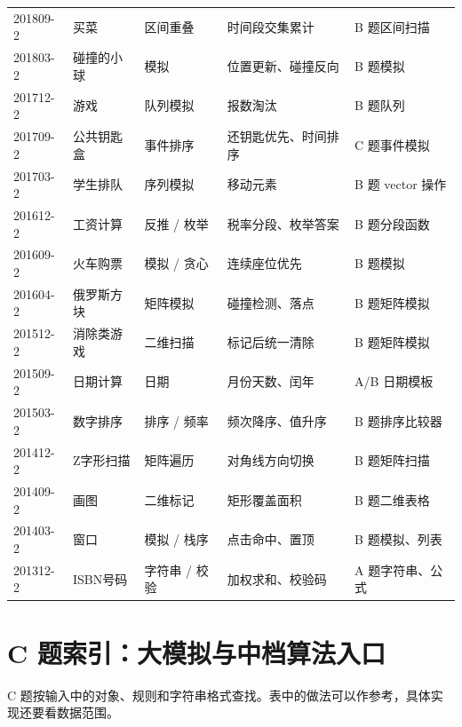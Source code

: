 \begin{longtable}{p{1.8cm}p{2.8cm}p{2.6cm}p{3.5cm}p{3.5cm}}
201809-2 & 买菜 & 区间重叠 & 时间段交集累计 & B 题区间扫描 \\
201803-2 & 碰撞的小球 & 模拟 & 位置更新、碰撞反向 & B 题模拟 \\
201712-2 & 游戏 & 队列模拟 & 报数淘汰 & B 题队列 \\
201709-2 & 公共钥匙盒 & 事件排序 & 还钥匙优先、时间排序 & C 题事件模拟 \\
201703-2 & 学生排队 & 序列模拟 & 移动元素 & B 题 vector 操作 \\
201612-2 & 工资计算 & 反推 / 枚举 & 税率分段、枚举答案 & B 题分段函数 \\
201609-2 & 火车购票 & 模拟 / 贪心 & 连续座位优先 & B 题模拟 \\
201604-2 & 俄罗斯方块 & 矩阵模拟 & 碰撞检测、落点 & B 题矩阵模拟 \\
201512-2 & 消除类游戏 & 二维扫描 & 标记后统一清除 & B 题矩阵模拟 \\
201509-2 & 日期计算 & 日期 & 月份天数、闰年 & A/B 日期模板 \\
201503-2 & 数字排序 & 排序 / 频率 & 频次降序、值升序 & B 题排序比较器 \\
201412-2 & Z字形扫描 & 矩阵遍历 & 对角线方向切换 & B 题矩阵扫描 \\
201409-2 & 画图 & 二维标记 & 矩形覆盖面积 & B 题二维表格 \\
201403-2 & 窗口 & 模拟 / 栈序 & 点击命中、置顶 & B 题模拟、列表 \\
201312-2 & ISBN号码 & 字符串 / 校验 & 加权求和、校验码 & A 题字符串、公式 \\
\bottomrule
\end{longtable}
\endgroup

\section{C 题索引：大模拟与中档算法入口}

C 题按输入中的对象、规则和字符串格式查找。表中的做法可以作参考，具体实现还要看数据范围。


